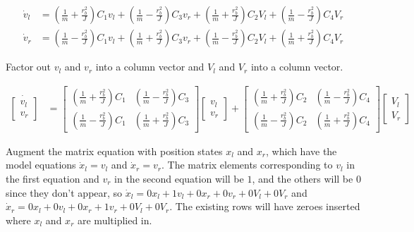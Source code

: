 \begin{align*}
  \dot{v}_l &= \left(\frac{1}{m} + \frac{r_b^2}{J}\right) C_1 v_l +
    \left(\frac{1}{m} - \frac{r_b^2}{J}\right) C_3 v_r +
    \left(\frac{1}{m} + \frac{r_b^2}{J}\right) C_2 V_l +
    \left(\frac{1}{m} - \frac{r_b^2}{J}\right) C_4 V_r \\
  \dot{v}_r &= \left(\frac{1}{m} - \frac{r_b^2}{J}\right) C_1 v_l +
    \left(\frac{1}{m} + \frac{r_b^2}{J}\right) C_3 v_r +
    \left(\frac{1}{m} - \frac{r_b^2}{J}\right) C_2 V_l +
    \left(\frac{1}{m} + \frac{r_b^2}{J}\right) C_4 V_r
\end{align*}

Factor out $v_l$ and $v_r$ into a column vector and $V_l$ and $V_r$ into a
column vector.

\begin{align*}
  \dot{\begin{bmatrix}
    v_l \\
    v_r
  \end{bmatrix}} &=
  \begin{bmatrix}
    \left(\frac{1}{m} + \frac{r_b^2}{J}\right) C_1 &
    \left(\frac{1}{m} - \frac{r_b^2}{J}\right) C_3 \\
    \left(\frac{1}{m} - \frac{r_b^2}{J}\right) C_1 &
    \left(\frac{1}{m} + \frac{r_b^2}{J}\right) C_3
  \end{bmatrix}
  \begin{bmatrix}
    v_l \\
    v_r
  \end{bmatrix} +
  \begin{bmatrix}
    \left(\frac{1}{m} + \frac{r_b^2}{J}\right) C_2 &
    \left(\frac{1}{m} - \frac{r_b^2}{J}\right) C_4 \\
    \left(\frac{1}{m} - \frac{r_b^2}{J}\right) C_2 &
    \left(\frac{1}{m} + \frac{r_b^2}{J}\right) C_4
  \end{bmatrix}
  \begin{bmatrix}
    V_l \\
    V_r
  \end{bmatrix}
\end{align*}

Augment the matrix equation with position states $x_l$ and $x_r$, which have the
model equations $\dot{x}_l = v_l$ and $\dot{x}_r = v_r$. The matrix elements
corresponding to $v_l$ in the first equation and $v_r$ in the second equation
will be $1$, and the others will be $0$ since they don't appear, so
$\dot{x}_l = 0x_l + 1v_l + 0x_r + 0v_r + 0V_l + 0V_r$ and
$\dot{x}_r = 0x_l + 0v_l + 0x_r + 1v_r + 0V_l + 0V_r$. The existing rows will
have zeroes inserted where $x_l$ and $x_r$ are multiplied in.

